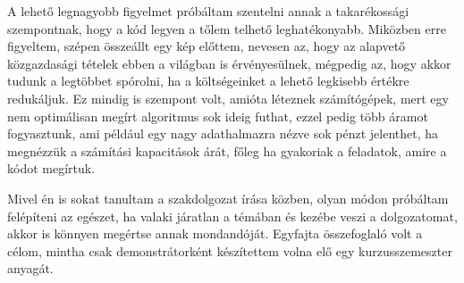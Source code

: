 \documentclass{article}
\theoremstyle{definition}
\theoremstyle{theorem}
\begin{document}
A lehető legnagyobb figyelmet próbáltam szentelni annak a takarékossági szempontnak, hogy a kód legyen a tőlem telhető leghatékonyabb. Miközben erre figyeltem, szépen összeállt egy kép előttem, nevesen az, hogy az alapvető közgazdasági tételek ebben a világban is érvényesülnek, mégpedig az, hogy akkor tudunk a legtöbbet spórolni, ha a költségeinket a lehető legkisebb értékre redukáljuk. Ez mindig is szempont volt, amióta léteznek számítógépek, mert egy nem optimálisan megírt algoritmus sok ideig futhat, ezzel pedig több áramot fogyasztunk, ami például egy nagy adathalmazra nézve sok pénzt jelenthet, ha megnézzük a számítási kapacitások árát, főleg ha gyakoriak a feladatok, amire a kódot megírtuk.

Mivel én is sokat tanultam a szakdolgozat írása közben, olyan módon próbáltam felépíteni az egészet, ha valaki járatlan a témában és kezébe veszi a dolgozatomat, akkor is könnyen megértse annak mondandóját. Egyfajta összefoglaló volt a célom, mintha csak demonstrátorként készítettem volna elő egy kurzusszemeszter anyagát.
\end{document}

